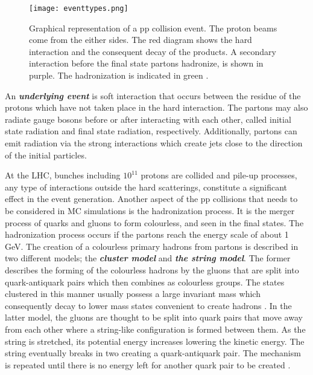 \begin{figure}[ht]
	\centering
	\texttt{[image: eventtypes.png]}
	\vspace{2mm}
	\caption[Graphical representation of a pp collision event. The proton beams come from the either sides. The red diagram shows the hard interaction and the consequent decay of the products. A secondary interaction before the final state partons hadronize, is shown in purple. The hadronization is indicated in green.]
	{Graphical representation of a pp collision event. The proton beams come from the either sides. The red diagram shows the hard interaction and the consequent decay of the products. A secondary interaction before the final state partons hadronize, is shown in purple. The hadronization is indicated in green \cite{Pttgen2016}.}
	\label{eventtypes}
\end{figure}

An \emph{\bf{underlying event}} is soft interaction that occurs between the residue of the protons which have not taken place in the hard interaction. The partons may also radiate gauge bosons before or after interacting with each other, called initial state radiation and final state radiation, respectively. Additionally, partons can emit radiation via the strong interactions which create jets close to the direction of the initial particles.

At the LHC, bunches including $10^{11}$ protons are collided and pile-up processes, any type of interactions outside the hard scatterings, constitute a significant effect in the event generation. Another aspect of the pp collisions that needs to be considered in MC simulations is the hadronization process. It is the merger process of quarks and gluons to form colourless, and seen in the final states. The hadronization process occurs if the partons reach the energy scale of about 1 GeV. The creation of a colourless primary hadrons from partons is described in two different models; the \emph{\bf{cluster model}} and \emph{\bf{the string model}}. The former describes the forming of the colourless hadrons by the gluons that are split into quark-antiquark pairs which then combines as colourless groups. The states clustered in this manner usually possess a large invariant mass which consequently decay to lower mass states convenient to create hadrons \cite{Webber1984}. In the latter model, the gluons are thought to be split into quark pairs that move away from each other where a string-like configuration is formed between them. As the string is stretched, its potential energy increases lowering the kinetic energy. The string eventually breaks in two creating a quark-antiquark pair. The mechanism is repeated until there is no energy left for another quark pair to be created \cite{Andersson1983}.

